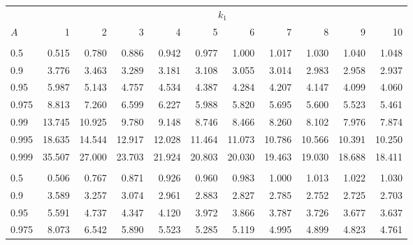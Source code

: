 \documentclass[
]{article}
\begin{document}
\begin{table}[H]
\centering
\begin{tabular}{lrrrrrrrrrr}
\toprule
\multicolumn{1}{c}{ } & \multicolumn{10}{c}{$k_1$} \\
\cmidrule(l{3pt}r{3pt}){2-11}
\hspace{1.1em}$A$ & 1 & 2 & 3 & 4 & 5 & 6 & 7 & 8 & 9 & 10\\
\midrule
\addlinespace[0.3em]
\multicolumn{11}{l}{\textbf{$k_2=6$}}\\
\hspace{1em}0.5 & 0.515 & 0.780 & 0.886 & 0.942 & 0.977 & 1.000 & 1.017 & 1.030 & 1.040 & 1.048\\
\hspace{1em}0.9 & 3.776 & 3.463 & 3.289 & 3.181 & 3.108 & 3.055 & 3.014 & 2.983 & 2.958 & 2.937\\
\hspace{1em}0.95 & 5.987 & 5.143 & 4.757 & 4.534 & 4.387 & 4.284 & 4.207 & 4.147 & 4.099 & 4.060\\
\hspace{1em}0.975 & 8.813 & 7.260 & 6.599 & 6.227 & 5.988 & 5.820 & 5.695 & 5.600 & 5.523 & 5.461\\
\hspace{1em}0.99 & 13.745 & 10.925 & 9.780 & 9.148 & 8.746 & 8.466 & 8.260 & 8.102 & 7.976 & 7.874\\
\hspace{1em}0.995 & 18.635 & 14.544 & 12.917 & 12.028 & 11.464 & 11.073 & 10.786 & 10.566 & 10.391 & 10.250\\
\hspace{1em}0.999 & 35.507 & 27.000 & 23.703 & 21.924 & 20.803 & 20.030 & 19.463 & 19.030 & 18.688 & 18.411\\
\addlinespace[0.3em]
\multicolumn{11}{l}{\textbf{$k_2=7$}}\\
\hspace{1em}0.5 & 0.506 & 0.767 & 0.871 & 0.926 & 0.960 & 0.983 & 1.000 & 1.013 & 1.022 & 1.030\\
\hspace{1em}0.9 & 3.589 & 3.257 & 3.074 & 2.961 & 2.883 & 2.827 & 2.785 & 2.752 & 2.725 & 2.703\\
\hspace{1em}0.95 & 5.591 & 4.737 & 4.347 & 4.120 & 3.972 & 3.866 & 3.787 & 3.726 & 3.677 & 3.637\\
\hspace{1em}0.975 & 8.073 & 6.542 & 5.890 & 5.523 & 5.285 & 5.119 & 4.995 & 4.899 & 4.823 & 4.761\\

\end{tabular}
\end{table}
\end{document}
